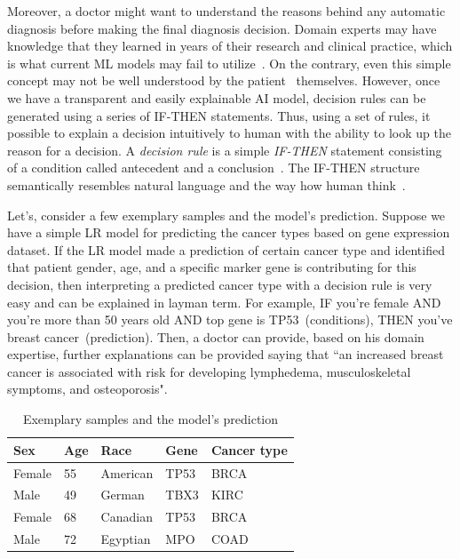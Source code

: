 \hspace*{3.5mm} Moreover, a doctor might want to understand the reasons behind any automatic diagnosis before making the final diagnosis decision. Domain experts may have knowledge that they learned in years of their research and clinical practice, which is what current ML models may fail to utilize~\cite{ming2018rulematrix}. 
On the contrary, even this simple concept may not be well understood by the patient~\cite{post2015patient} themselves. However, once we have a transparent and easily explainable AI model, decision rules can be generated using a series of IF-THEN statements. Thus, using a set of rules, it possible to explain a decision intuitively to human with the ability to look up the reason for a decision. A \textit{decision rule} is a simple \textit{IF-THEN} statement consisting of a condition called antecedent and a conclusion~\cite{molnar2019interpretable}. The IF-THEN structure semantically resembles natural language and the way how human think~\cite{molnar2019interpretable}. 

\hspace*{3.5mm} Let's, consider a few exemplary samples and the model's prediction. Suppose we have a simple LR model for predicting the cancer types based on gene expression dataset. If the LR model made a prediction of certain cancer type and identified that patient gender, age, and a specific marker gene is contributing for this decision, then interpreting a predicted cancer type with a decision rule is very easy and can be explained in layman term. For example, IF you're female AND you're more than 50 years old AND top gene is TP53~(conditions), THEN you've breast cancer~(prediction). Then, a doctor can provide, based on his domain expertise, further explanations can be provided saying that ``an increased breast cancer is associated with risk for developing lymphedema, musculoskeletal symptoms, and osteoporosis". 

\begin{table}[h!]
    \caption{Exemplary samples and the model's prediction}
    \label{ge:rule_example}
    \vspace{-6mm}
    \begin{center}
        \scriptsize
        \begin{tabular}{l|l|l|l|l}
            \hline
            \rowcolor{Gray}
            \textbf{Sex} & \textbf{Age} & \textbf{Race} & \textbf{Gene} & \textbf{Cancer type} \\\hline    
            Female & 55 & American & TP53 & BRCA \\\hline
            Male & 49 & German & TBX3 & KIRC \\\hline
            Female & 68 & Canadian & TP53 & BRCA \\\hline
            Male & 72 & Egyptian & MPO & COAD \\\hline
        \end{tabular}
        \vspace{-4mm}
    \end{center}
\end{table}

